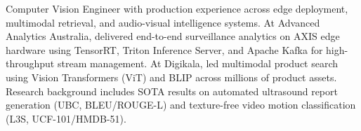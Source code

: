 \small{Computer Vision Engineer with production experience across edge deployment, multimodal retrieval, and audio-visual intelligence systems. At Advanced Analytics Australia, delivered end-to-end surveillance analytics on AXIS edge hardware using TensorRT, Triton Inference Server, and Apache Kafka for high-throughput stream management. At Digikala, led multimodal product search using Vision Transformers (ViT) and BLIP across millions of product assets. Research background includes SOTA results on automated ultrasound report generation (UBC, BLEU/ROUGE-L) and texture-free video motion classification (L3S, UCF-101/HMDB-51).}\vspace{3pt}
